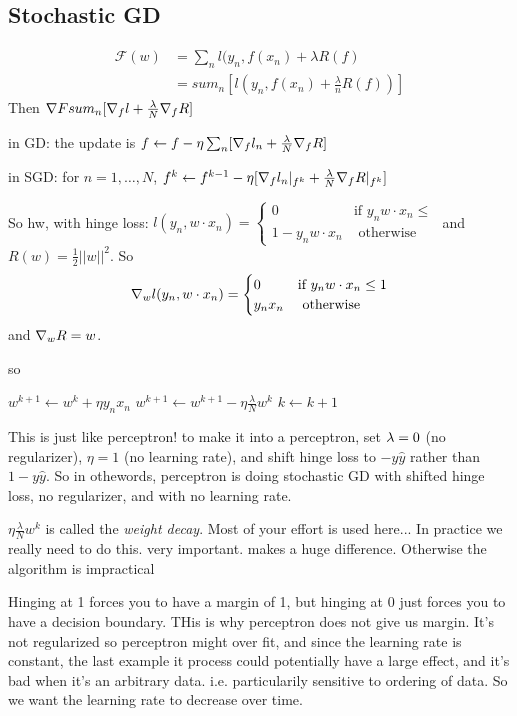 \subsection{Stochastic GD}
\label{sec:stochasticgd}

\begin{align*}
\mathcal{F}(w) &= \sum_n l(y_n, f(x_n) + \lambda R(f)\\
&=sum_n[l(y_n, f(x_n) + \frac{\lambda}{n}R(f))]
\end{align*}
Then $\nabla F sum_n[\nabla_fl + \frac{\lambda}{N}\nabla_fR]$

in GD: the update is $f \gets f - \eta \sum_n[\nabla_f l_n +
\frac{\lambda}{N}\nabla_f R]$

in SGD: for $n=1,\dots,N$, $f^k \gets f^{k-1} - \eta [ \nabla_f l_n|_{f^k} +
\frac{\lambda}{N}\nabla_f R|_{f^k}]$

So hw, with hinge loss:
$l(y_n, w\cdot x_n) =
\begin{cases}
  0 & \text{if } y_nw\cdot x_n \le \\
  1-y_nw\cdot x_n & \text{ otherwise}
\end{cases}
$
and $R(w) = \frac{1}{2}||w||^2$.
So $$\nabla_wl(y_n, w\cdot x_n) =
\begin{cases}
  0 & \text{if } y_nw\cdot x_n \le 1\\
  y_nx_n & \text{ otherwise}
\end{cases}
$$
and $\nabla_w R = w$.

so
\begin{algorithmic}
       \STATE $w^{k+1} \gets w^{k} + \eta y_n x_n$
     \ENDIF
   \STATE  $w^{k+1} \gets w^{k+1} - \eta \frac{\lambda}{N}w^{k}$
   \STATE $k \gets k+1$
\ENDFOR
\end{algorithmic}
This is just like perceptron! to make it into a perceptron, set
$\lambda=0$ (no regularizer), $\eta = 1$ (no learning rate), and shift
hinge loss to $-y\hat y$ rather than $1-y\hat y$.
So in othewords, perceptron is doing stochastic GD with shifted hinge
loss, no regularizer, and with no learning rate.

$\eta \frac{\lambda}{N}w^{k}$ is called the \emph{weight decay}. Most
of your effort is used here... In practice we really need to do
this. very important. makes a huge difference. Otherwise the algorithm
is impractical


Hinging at 1 forces you to have a margin of 1, but hinging at 0 just
forces you to have a decision boundary. THis is why perceptron does
not give us margin. It's not regularized so perceptron might over fit,
and since the learning rate is constant, the last example it process
could potentially have a large effect, and it's bad when it's an
arbitrary data. i.e. particularily sensitive to ordering of data. So
we want the learning rate to decrease over time.

